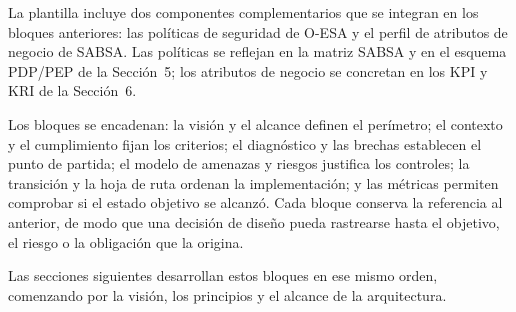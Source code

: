 La plantilla incluye dos componentes complementarios que se integran en los bloques anteriores: las
políticas de seguridad de O-ESA y el perfil de atributos de negocio de SABSA. Las políticas se reflejan
en la matriz SABSA y en el esquema PDP/PEP de la Sección~5; los atributos de negocio se concretan en
los KPI y KRI de la Sección~6.

Los bloques se encadenan: la visión y el alcance definen el perímetro; el contexto y el cumplimiento
fijan los criterios; el diagnóstico y las brechas establecen el punto de partida; el modelo de
amenazas y riesgos justifica los controles; la transición y la hoja de ruta ordenan la implementación;
y las métricas permiten comprobar si el estado objetivo se alcanzó. Cada bloque conserva la referencia
al anterior, de modo que una decisión de diseño pueda rastrearse hasta el objetivo, el riesgo o la
obligación que la origina.

Las secciones siguientes desarrollan estos bloques en ese mismo orden, comenzando por la visión, los
principios y el alcance de la arquitectura.
